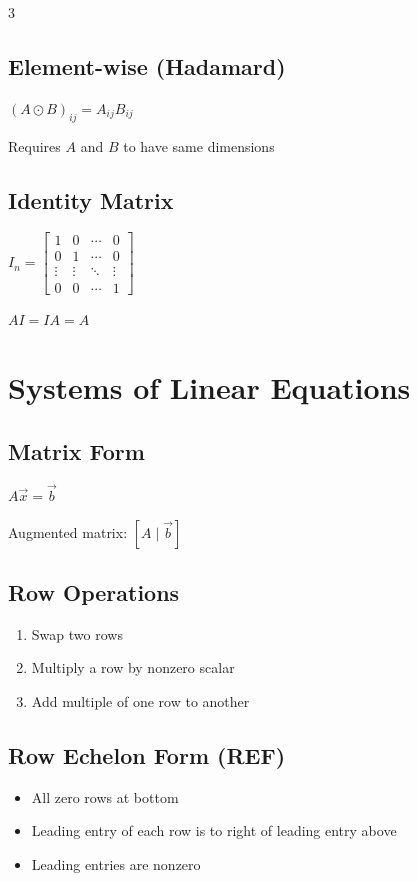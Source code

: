 \documentclass[10pt,landscape]{article}
\begin{document}
\begin{multicols*}{3}
\subsection*{Element-wise (Hadamard)}
$(A \odot B)_{ij} = A_{ij}B_{ij}$

Requires $A$ and $B$ to have same dimensions

\subsection*{Identity Matrix}
$I_n = \begin{bmatrix} 1 & 0 & \cdots & 0 \\ 0 & 1 & \cdots & 0 \\ \vdots & \vdots & \ddots & \vdots \\ 0 & 0 & \cdots & 1 \end{bmatrix}$

$AI = IA = A$

\columnbreak%
\section*{Systems of Linear Equations}

\subsection*{Matrix Form}
$A\vec{x} = \vec{b}$

Augmented matrix: $[A \; | \; \vec{b}]$

\subsection*{Row Operations}
\begin{enumerate}
    \item Swap two rows
    \item Multiply a row by nonzero scalar
    \item Add multiple of one row to another
\end{enumerate}

\subsection*{Row Echelon Form (REF)}
\begin{itemize}
    \item All zero rows at bottom
    \item Leading entry of each row is to right of leading entry above
    \item Leading entries are nonzero
\end{itemize}


\end{multicols*}
\end{document}
